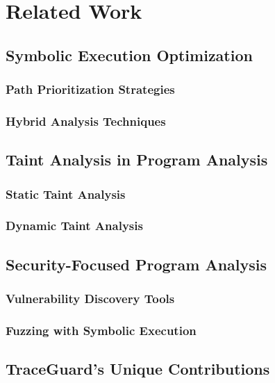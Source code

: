 \chapter{Related Work}


\section{Symbolic Execution Optimization}
\subsection{Path Prioritization Strategies}

\subsection{Hybrid Analysis Techniques}

\section{Taint Analysis in Program Analysis}
\subsection{Static Taint Analysis}

\subsection{Dynamic Taint Analysis}

\section{Security-Focused Program Analysis}
\subsection{Vulnerability Discovery Tools}

\subsection{Fuzzing with Symbolic Execution}

\section{TraceGuard's Unique Contributions}
